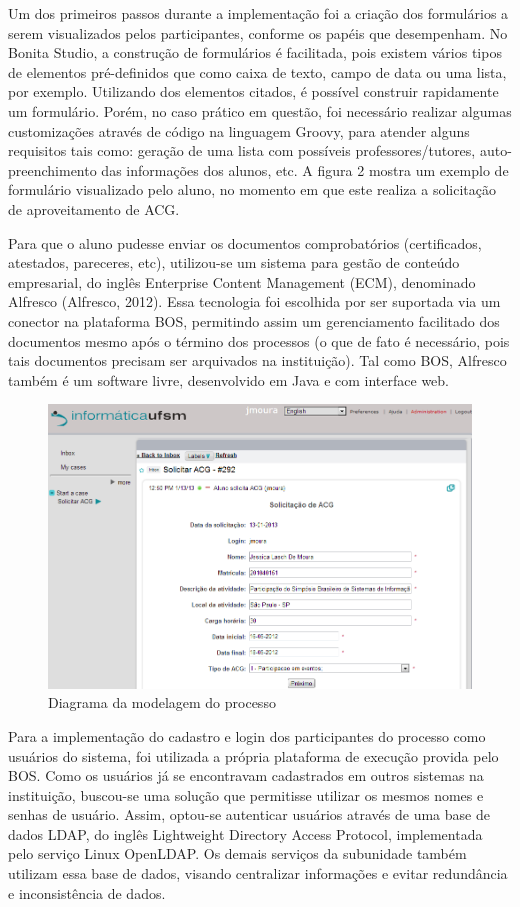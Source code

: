 \documentclass[12pt]{article}
\begin{document}
Um dos primeiros passos durante a implementação foi a criação dos formulários a serem visualizados pelos participantes, conforme os papéis que desempenham. No Bonita Studio, a construção de formulários é facilitada, pois existem vários tipos de elementos pré-definidos que como caixa de texto, campo de data ou uma lista, por exemplo. Utilizando dos elementos citados, é possível construir rapidamente um formulário. Porém, no caso prático em questão, foi necessário realizar algumas customizações através de código na linguagem Groovy, para atender alguns requisitos tais como: geração de uma lista com possíveis professores/tutores, auto-preenchimento das informações dos alunos, etc. A figura 2 mostra um exemplo de formulário visualizado pelo aluno, no momento em que este realiza a solicitação de aproveitamento de ACG.

Para que o aluno pudesse enviar os documentos comprobatórios (certificados, atestados, pareceres, etc), utilizou-se um sistema para gestão de conteúdo empresarial, do inglês Enterprise Content Management (ECM), denominado Alfresco (Alfresco, 2012). Essa tecnologia foi escolhida por ser suportada via um conector na plataforma BOS, permitindo assim um gerenciamento facilitado dos documentos mesmo após o término dos processos (o que de fato é necessário, pois tais documentos precisam ser arquivados na instituição). Tal como BOS, Alfresco também é um software livre, desenvolvido em Java e com interface web.

\begin{figure}[ht]
\centering
\includegraphics[width=.6\textwidth]{images/formSolicitacao.png}
\caption{Diagrama da modelagem do processo}
\label{fig:Fig1}
\end{figure}

Para a implementação do cadastro e login dos participantes do processo como usuários do sistema, foi utilizada a própria plataforma de execução provida pelo BOS. Como os usuários já se encontravam cadastrados em outros sistemas na instituição, buscou-se uma solução que permitisse utilizar os mesmos nomes e senhas de usuário. Assim, optou-se autenticar usuários através de uma base de dados LDAP, do inglês Lightweight Directory Access Protocol, implementada pelo serviço Linux OpenLDAP. Os demais serviços da subunidade também utilizam essa base de dados, visando centralizar informações e evitar redundância e inconsistência de dados.
\end{document}
